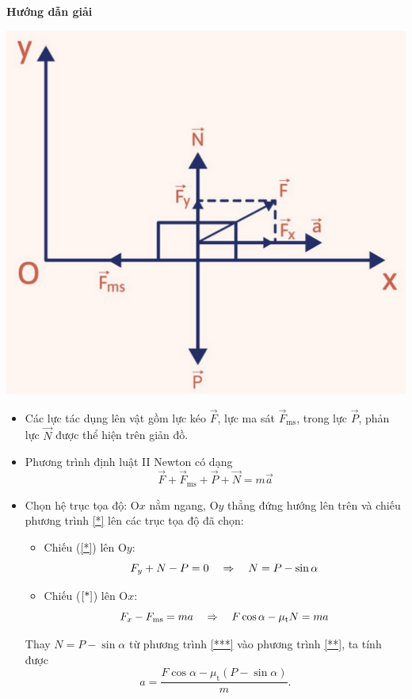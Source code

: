 {	\begin{center}
		\textbf{Hướng dẫn giải}
	\end{center}
	\begin{center}
		\includegraphics[scale=0.5]{../figs/G10-17-1}
	\end{center}
	
	\begin{itemize}
		\item Các lực tác dụng lên vật gồm lực kéo $\vec F$, lực ma sát $\vec F_\text{ms}$, trong lực $\vec P$, phản lực $\vec N$ được thể hiện trên giản đồ. 
		
		\item Phương trình định luật II Newton có dạng 
		\begin{equation}\label{*}
			\vec F +\vec F_\text{ms} + \vec P + \vec N = m \vec a
		\end{equation}
		
		\item Chọn hệ trục tọa độ: O$x$ nằm ngang, O$y$ thẳng đứng hướng lên trên và chiếu phương trình \eqref{*} lên các trục tọa độ đã chọn:
			\begin{itemize}
				\item Chiếu (\ref{*}) lên O$y$:
				\begin{equation}\label{***}
					F_y + N - P = 0 \\
					\quad\Rightarrow\quad N = P - \sin \alpha
				\end{equation}
				\item Chiếu ($\ref{*}$) lên O$x$:
					\begin{equation}\label{**}
						F_x - F_\text{ms} = ma \\
						\quad\Rightarrow\quad F \cos \alpha - \mu_\text{t} N = ma
					\end{equation}
			\end{itemize}
		Thay $N = P - \sin \alpha$ từ phương trình \eqref{***} vào phương trình \eqref{**}, ta tính được 
			$$a=\dfrac{F \cos \alpha - \mu_\text{t} (P-\sin \alpha)}{m}.$$
	\end{itemize}
}

